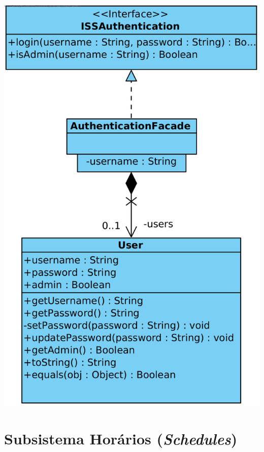 \documentclass[a4paper,12pt]{scrreprt}
\begin{document}
\begin{minipage}{\textwidth}
    \centering
    \includegraphics[width=1\textwidth]{images/class-diagrams/2-authentication.png}
    \label{fig:5-2-subsistema_autenticacao}
\end{minipage}

\section{Subsistema Horários (\textit{Schedules})}
\end{document}
